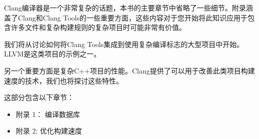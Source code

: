 Clang编译器是一个非常复杂的话题，本书的主要章节中省略了一些细节。附录涵盖了Clang和Clang Tools的一些重要方面，这些内容对于您开始将此知识应用于包含许多文件和复杂构建规则的复杂项目时可能非常有价值。

我们将从讨论如何将Clang Tools集成到使用复杂编译标志的大型项目中开始。LLVM是这类项目的示例之一。

另一个重要方面是复杂C++项目的性能。Clang提供了可以用于改善此类项目构建速度的技术，我们也将探讨这些特性。

这部分包含以下章节：

\begin{itemize}
\item
附录 1： 编译数据库

\item
附录 2: 优化构建速度
\end{itemize}